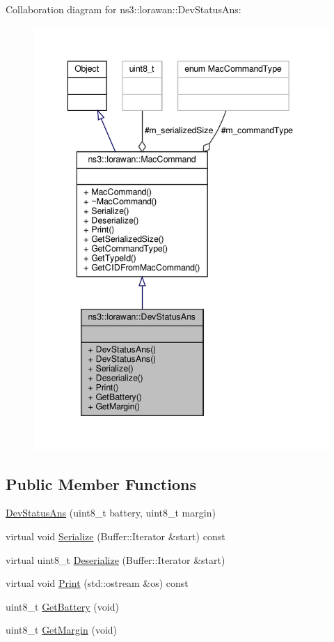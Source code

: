 Collaboration diagram for ns3\+:\+:lorawan\+:\+:Dev\+Status\+Ans\+:
\nopagebreak
\begin{figure}[H]
\begin{center}
\leavevmode
\includegraphics[width=343pt]{classns3_1_1lorawan_1_1DevStatusAns__coll__graph}
\end{center}
\end{figure}
\subsection*{Public Member Functions}
\begin{DoxyCompactItemize}
\item 
\hyperlink{classns3_1_1lorawan_1_1DevStatusAns_a2a117f790856a52f98743c42aaab5097}{Dev\+Status\+Ans} (uint8\+\_\+t battery, uint8\+\_\+t margin)
\item 
virtual void \hyperlink{classns3_1_1lorawan_1_1DevStatusAns_ab1e376c78c06b679eeb6d73d32aaa62f}{Serialize} (Buffer\+::\+Iterator \&start) const
\item 
virtual uint8\+\_\+t \hyperlink{classns3_1_1lorawan_1_1DevStatusAns_a359096eee9c97dd58abd5b37f2bcd059}{Deserialize} (Buffer\+::\+Iterator \&start)
\item 
virtual void \hyperlink{classns3_1_1lorawan_1_1DevStatusAns_a167cca1cb129a2084dcc5412a00b3126}{Print} (std\+::ostream \&os) const
\item 
uint8\+\_\+t \hyperlink{classns3_1_1lorawan_1_1DevStatusAns_a20703d8a96ccafe156ef0403912ac1c9}{Get\+Battery} (void)
\item 
uint8\+\_\+t \hyperlink{classns3_1_1lorawan_1_1DevStatusAns_a571f9538c6252bc91fe8dc7e7c6d0f11}{Get\+Margin} (void)
\end{DoxyCompactItemize}
